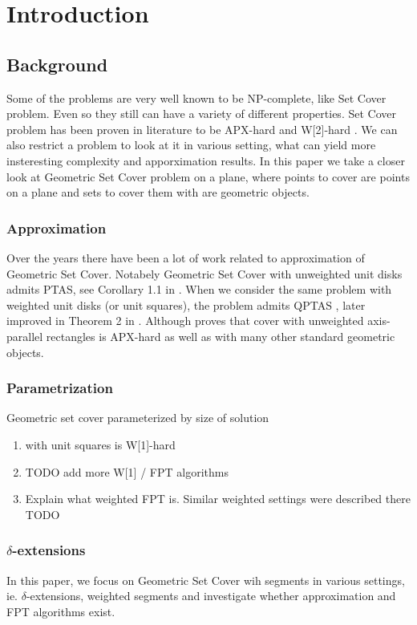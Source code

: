 \chapter{Introduction}

\section{Background}
Some of the problems are very well known to be NP-complete, like
Set Cover problem. Even so they still can have a variety
of different properties. Set Cover problem has been proven
in literature to be APX-hard and W[2]-hard \cite{platypus_book}.
We can also restrict a problem to look at it in various setting,
what can yield more insteresting complexity and apporximation results.
In this paper we take a closer look at Geometric Set Cover problem
on a plane, where points to cover are points on a plane
and sets to cover them with are geometric objects.

\subsection{Approximation}
Over the years there have been a lot of work related to approximation
of Geometric Set Cover. Notabely 
Geometric Set Cover with unweighted unit disks admits PTAS, see
Corollary 1.1 in \cite{unit_disks}. When we consider the same problem
with weighted unit disks (or unit squares), the problem admits QPTAS
\cite{settling_apx_hardness}, later improved in
Theorem 2 in \cite{voronoi_true}.
Although \cite{rectangles_apx_hard} 
proves that cover with unweighted axis-parallel rectangles
is APX-hard as well as with many other
standard geometric objects.

\subsection{Parametrization}
Geometric set cover parameterized by size of solution
	\begin{enumerate}
		\item with unit squares is W[1]-hard \cite{marx05}
		\item TODO add more W[1] / FPT algorithms
\item Explain what weighted FPT is. Similar weighted settings
were described there TODO
	\end{enumerate}

\subsection{$\delta$-extensions}
In this paper, we focus on Geometric Set Cover wih segments
in various settings, ie. $\delta$-extensions, weighted segments
and investigate whether approximation and FPT algorithms exist.

